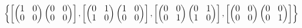 \documentclass[45pt]{article}
\begin{document}
 $\begin{Bmatrix}
{\fontsizeXii
    \begin{bmatrix}
    \begin{pmatrix}
    1&0\\
    0&0\\
  \end{pmatrix}
    \begin{pmatrix}
    0&0\\
    0&0 \\
  \end{pmatrix}
\end{bmatrix},

\begin{bmatrix}
  \begin{pmatrix}
  0&1\\
  1&0\\
\end{pmatrix}
  \begin{pmatrix}
  1&0\\
  0&0 \\
\end{pmatrix}
\end{bmatrix},

\begin{bmatrix}
  \begin{pmatrix}
  0&0\\
  0&1\\
\end{pmatrix}
  \begin{pmatrix}
  0&1\\
  1&0 \\
\end{pmatrix}
\end{bmatrix},

\begin{bmatrix}
  \begin{pmatrix}
  0&0\\
  0&0\\
\end{pmatrix}
  \begin{pmatrix}
  0&0\\
  0&1 \\
\end{pmatrix}
\end{bmatrix}}
\end{Bmatrix}$
\end{document}
